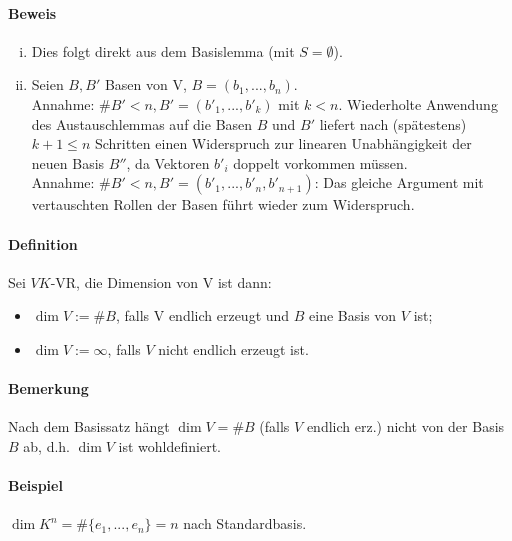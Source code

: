 \paragraph{Beweis}
    \begin{enumerate}[(i)]
        \item  Dies folgt direkt aus dem Basislemma (mit $S=\emptyset$).
        \item Seien $B,B'$ Basen von V, $B = (b_1,...,b_n)$.\\
        Annahme: $\#B' < n, B' = (b'_1,...,b'_k)$ mit $k < n$. Wiederholte Anwendung des Austauschlemmas auf die Basen $B$ und $B'$ liefert nach (spätestens) $k+1\leq n$ Schritten einen Widerspruch zur linearen Unabhängigkeit der neuen Basis $B''$, da Vektoren $b'_i$ doppelt vorkommen müssen.\\
        Annahme: $\#B' < n, B' = (b'_1,...,b'_n,b'_{n+1})$: Das gleiche Argument mit vertauschten Rollen der Basen führt wieder zum Widerspruch.
     \end{enumerate}

\paragraph{Definition}
    Sei $V K$-VR, die Dimension von V ist dann:
    \begin{itemize}
        \item $\dim V:= \#B$, falls V endlich erzeugt und $B$ eine Basis von $V$ ist;
        \item $\dim V:= \infty$, falls $V$ nicht endlich erzeugt ist.
    \end{itemize}
\paragraph{Bemerkung}
    Nach dem Basissatz hängt $\dim V = \#B$ (falls $V$ endlich erz.) nicht von der Basis $B$ ab, d.h. $\dim V$ ist wohldefiniert.
\paragraph{Beispiel}
    $\dim K^n = \#\{e_1,...,e_n\} = n$ nach Standardbasis.
